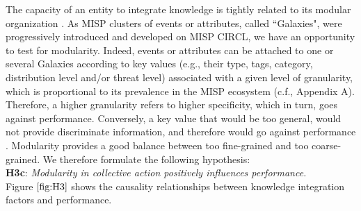 \documentclass[unnumsec,webpdf,contemporary,large]{oup-authoring-template}%
\theoremstyle{thmstyleone}%
\theoremstyle{thmstyletwo}%
\theoremstyle{thmstylethree}%
\begin{document}
The capacity of an entity to integrate knowledge is tightly related to its modular organization \cite{tononi_consciousness_1998,narduzzo_role_2005,baldwin_architecture_2006}. As MISP clusters of events or attributes, called ``Galaxies", were progressively introduced and developed on MISP CIRCL, we have an opportunity to test for modularity. Indeed, events or attributes can be attached to one or several Galaxies according to key values (e.g., their type, tags, category, distribution level and/or threat level) associated with a given level of granularity, which is proportional to its prevalence in the MISP ecosystem (c.f., Appendix A). Therefore, a higher granularity refers to higher specificity, which in turn, goes against performance. Conversely, a key value that would be too general, would not provide discriminate information, and therefore would go against performance {\cite{west2016impact}}. Modularity provides a good balance between too fine-grained and too coarse-grained. We therefore formulate the following hypothesis:\\

\textbf{H3c}: \textit{Modularity in collective action positively influences performance.}\\

\noindent
Figure $\ref{fig:H3}$ shows the causality relationships between knowledge integration factors and performance.
\end{document}
